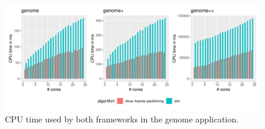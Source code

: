 \begin{figure}
    \centering
    \includegraphics[width=\textwidth,keepaspectratio]{gfx/results/cpu_genome_comb}
    \caption{CPU time used by both frameworks in the genome application.}%
    \label{fig:evaluation:genome-cpu}
\end{figure}



